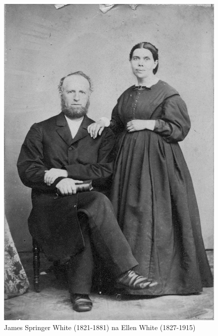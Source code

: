 \begin{figure}[hp]
    \centering
    \includegraphics[width=1\linewidth]{images/james-and-ellen-white.jpg}
    \caption*{James Springer White (1821-1881) na Ellen White (1827-1915)}
    \label{fig:james-and-ellen-white}
\end{figure}


